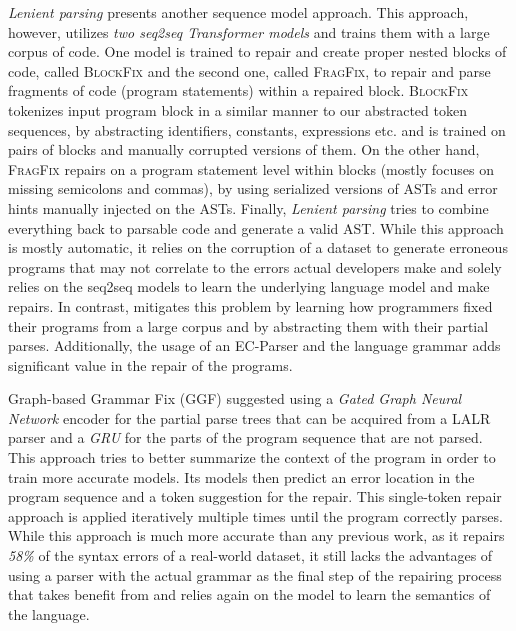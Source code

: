 \emph{Lenient parsing} \citep{Ahmed_2021} presents another sequence model
approach. This approach, however, utilizes \emph{two seq2seq Transformer models}
and trains them with a large corpus of code. One model is trained to repair and
create proper nested blocks of code, called \textsc{BlockFix} and the second
one, called \textsc{FragFix}, to repair and parse fragments of code (\eg program
statements) within a repaired block. \textsc{BlockFix} tokenizes input program
block in a similar manner to our abstracted token sequences, by abstracting
identifiers, constants, expressions etc. and is trained on pairs of blocks and
manually corrupted versions of them. On the other hand, \textsc{FragFix} repairs
on a program statement level within blocks (mostly focuses on missing semicolons
and commas), by using serialized versions of ASTs and error hints manually
injected on the ASTs. Finally, \emph{Lenient parsing} tries to combine
everything back to parsable code and generate a valid AST. While this approach
is mostly automatic, it relies on the corruption of a dataset to generate
erroneous programs that may not correlate to the errors actual developers make
and solely relies on the seq2seq models to learn the underlying language model
and make repairs. In contrast, \toolname mitigates this problem by learning how
programmers fixed their programs from a large corpus and by abstracting them
with their partial parses. Additionally, the usage of an EC-Parser and the
language grammar adds significant value in the repair of the programs.

%
Graph-based Grammar Fix (\textsc{GGF}) \citep{Wu2020} suggested using a
\emph{Gated Graph Neural Network} encoder for the partial parse trees that can
be acquired from a LALR parser and a \emph{GRU} for the parts of the program
sequence that are not parsed. This approach tries to better summarize the
context of the program in order to train more accurate models. Its models then
predict an error location in the program sequence and a token suggestion for the
repair. This single-token repair approach is applied iteratively multiple times
until the program correctly parses. While this approach is much more accurate
than any previous work, as it repairs \emph{58\%} of the syntax errors of a
real-world dataset, it still lacks the advantages of using a parser with the
actual grammar as the final step of the repairing process that \toolname takes
benefit from and relies again on the model to learn the semantics of the
language.

